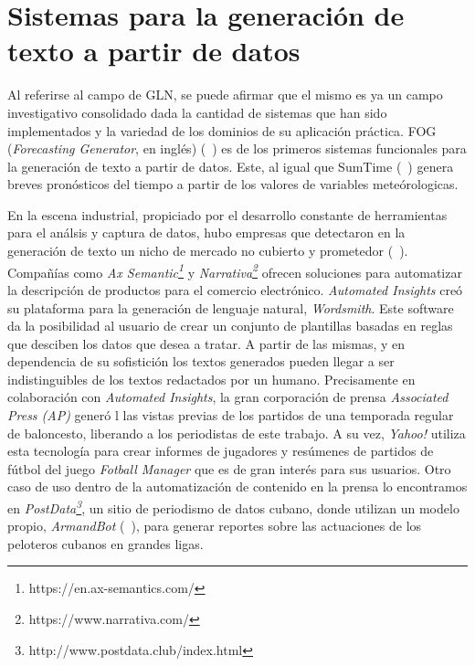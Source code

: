 \section{Sistemas para la generación de texto a partir de datos}

    Al referirse al campo de GLN, se puede afirmar que el mismo es ya un campo investigativo consolidado dada la cantidad 
de sistemas que han sido implementados y la variedad de los dominios de su aplicación práctica. FOG (\emph{Forecasting Generator}, en inglés) (~\cite{goldberg1994using}) es 
de los primeros sistemas funcionales para la generación de texto a partir de datos. Este, al igual que SumTime (~\cite{reiter2005choosing}) genera breves pronósticos del tiempo
a partir de los valores de variables meteórologicas. 

    En la escena industrial, propiciado por el desarrollo constante de herramientas para el análsis y captura de datos,
hubo empresas que detectaron en la generación de texto un nicho de mercado no cubierto y prometedor (~\cite{dale2020natural}). Compañías como \textit{Ax Semantic\footnote[1]{https://en.ax-semantics.com/}} y 
\textit{Narrativa\footnote[2]{https://www.narrativa.com/}} ofrecen soluciones para automatizar la descripción de productos para el comercio electrónico. 
\textit{Automated Insights} creó su plataforma para la generación de lenguaje natural, \textit{Wordsmith}. Este software da la posibilidad al usuario de crear un conjunto 
de plantillas basadas en reglas que desciben los datos que desea a tratar. A partir de las mismas, y en dependencia de su sofistición los textos generados pueden llegar a ser 
indistinguibles de los textos redactados por un humano. Precisamente en colaboración con \textit{Automated Insights}, la gran corporación de prensa \textit{Associated Press (AP)} generó l
las vistas previas de los partidos de una temporada regular de baloncesto, liberando a los periodistas de este trabajo. A su vez, \textit{Yahoo!} utiliza esta tecnología para crear informes 
de jugadores y resúmenes de partidos de fútbol del juego \textit{Fotball Manager} que es de gran interés para sus usuarios. Otro caso de uso dentro de la automatización de contenido en la prensa lo encontramos en \textit{PostData\footnote[3]{http://www.postdata.club/index.html}}, un sitio de periodismo 
de datos cubano, donde utilizan un modelo propio, \textit{ArmandBot} (~\cite{balboa2020}), para generar reportes sobre las actuaciones de los peloteros cubanos en grandes ligas.

